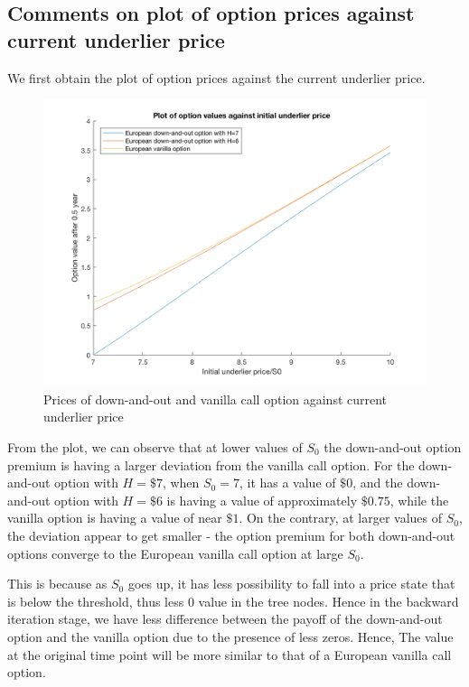 \subsection{Comments on plot of option prices against current underlier price}
We first obtain the plot of option prices against the current underlier price.
\begin{figure}[htbp!]
	\centering
	\includegraphics[scale=0.3]{A1_1_plot.png}
	\caption{Prices of down-and-out and vanilla call option against current underlier price}
\end{figure}

From the plot, we can observe that at lower values of $S_0$ the down-and-out option premium is having a larger deviation from the vanilla call option. For the down-and-out option with $H = \$7$, when $S_0=7$, it has a value of $\$0$, and the down-and-out option with $H = \$6$ is having a value of approximately $\$0.75$, while the vanilla option is having a value of near $\$1$. On the contrary, at larger values of $S_0$, the deviation appear to get smaller - the option premium for both down-and-out options converge to the European vanilla call option at large $S_0$. 

This is because as $S_0$ goes up, it has less possibility to fall into a price state that is below the threshold, thus less 0 value in the tree nodes. Hence in the backward iteration stage, we have less difference between the payoff of the down-and-out option and the vanilla option due to the presence of less zeros. Hence, The value at the original time point will be more similar to that of a European vanilla call option.

